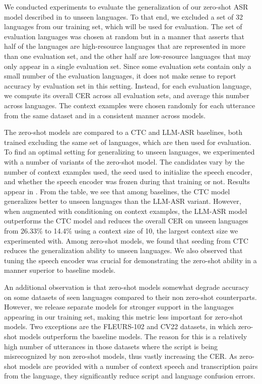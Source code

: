 \documentclass[]{fairmeta}
\begin{document}
We conducted experiments to evaluate the generalization of our zero-shot ASR model described in  to unseen languages. To that end, we excluded a set of 32 languages from our training set, which will be used for evaluation. The set of evaluation languages was chosen at random but in a manner that asserts that half of the languages are high-resource languages that are represented in more than one evaluation set, and the other half are low-resource languages that may only appear in a single evaluation set. Since some evaluation sets contain only a small number of the evaluation languages, it does not make sense to report accuracy by evaluation set in this setting. Instead, for each evaluation language, we compute its overall CER across all evaluation sets, and average this number across languages. The context examples were chosen randomly for each utterance from the same dataset and in a consistent manner across models. 

The zero-shot models are compared to a CTC and LLM-ASR baselines, both trained excluding the same set of languages, which are then used for evaluation. To find an optimal setting for generalizing to unseen languages, we experimented with a number of variants of the zero-shot model. The candidates vary by the number of context examples used, the seed used to initialize the speech encoder, and whether the speech encoder was frozen during that training or not. Results appear in . From the table, we see that among baselines, the CTC model generalizes better to unseen languages than the LLM-ASR variant. However, when augmented with conditioning on context examples, the LLM-ASR model outperforms the CTC model and reduces the overall CER on unseen languages from 26.33\% to 14.4\% using a context size of 10, the largest context size we experimented with. Among zero-shot models, we found that seeding from CTC reduces the generalization ability to unseen languages. We also observed that tuning the speech encoder was crucial for demonstrating the zero-shot ability in a manner superior to baseline models.

An additional observation is that zero-shot models somewhat degrade accuracy on some datasets of seen languages compared to their non zero-shot counterparts. However, we release separate models for stronger support in the languages appearing in our training set, making this metric less important for zero-shot models. Two exceptions are the FLEURS-102 and CV22 datasets, in which zero-shot models outperform the baseline models. The reason for this is a relatively high number of utterances in those datasets where the script is being misrecognized by non zero-shot models, thus vastly increasing the CER. As zero-shot models are provided with a number of context speech and transcription pairs from the language, they significantly reduce script and language confusion errors. 
\end{document}
